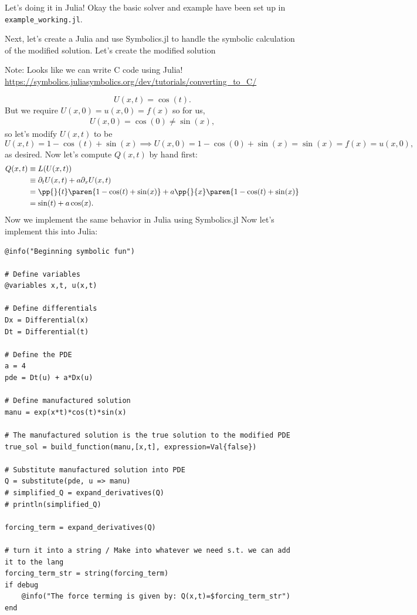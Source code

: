 \documentclass[12pt]{report}
\begin{document}
Let's doing it in Julia! Okay the basic solver and example have been set up in \verb+example_working.jl+.

Next, let's create a Julia and use Symbolics.jl to handle the symbolic calculation of the modified solution. Let's create the modified solution

Note: Looks like we can write C code using Julia! \url{https://symbolics.juliasymbolics.org/dev/tutorials/converting_to_C/}


\begin{equation*}
    U(x,t) = \cos(t).
\end{equation*}
But we require $U(x,0) = u(x,0) = f(x)$ so for us,
\begin{align*}
    U(x,0) = \cos(0) \neq \sin(x),
\end{align*}
so let's modify $U(x,t)$ to be
\begin{equation*}
    U(x,t) = 1 - \cos(t) + \sin(x) \implies U(x,0) = 1 - \cos(0) + \sin(x) = \sin(x) = f(x) = u(x,0), 
\end{equation*}
as desired. Now let's compute $Q(x,t)$ by hand first:
 \begin{align*}
    Q(x,t) &\equiv L(U(x,t))\\
    &\equiv \partial_t U(x,t) + a \partial_x U(x,t)\\
    &= \pp{}{t}\paren{1 - \cos(t) + \sin(x)} + a \pp{}{x}\paren{1 - \cos(t) + \sin(x)}\\
    &= \sin(t) + a \cos(x).
 \end{align*}
Now we implement the same behavior in Julia using Symbolics.jl
Now let's implement this into Julia:
\begin{lstlisting}
@info("Beginning symbolic fun")

# Define variables
@variables x,t, u(x,t)

# Define differentials
Dx = Differential(x)
Dt = Differential(t)

# Define the PDE
a = 4
pde = Dt(u) + a*Dx(u)

# Define manufactured solution
manu = exp(x*t)*cos(t)*sin(x)

# The manufactured solution is the true solution to the modified PDE
true_sol = build_function(manu,[x,t], expression=Val{false})

# Substitute manufactured solution into PDE
Q = substitute(pde, u => manu)
# simplified_Q = expand_derivatives(Q)
# println(simplified_Q)

forcing_term = expand_derivatives(Q)

# turn it into a string / Make into whatever we need s.t. we can add it to the lang
forcing_term_str = string(forcing_term)
if debug
    @info("The force terming is given by: Q(x,t)=$forcing_term_str")
end
\end{lstlisting} 
\end{document}
